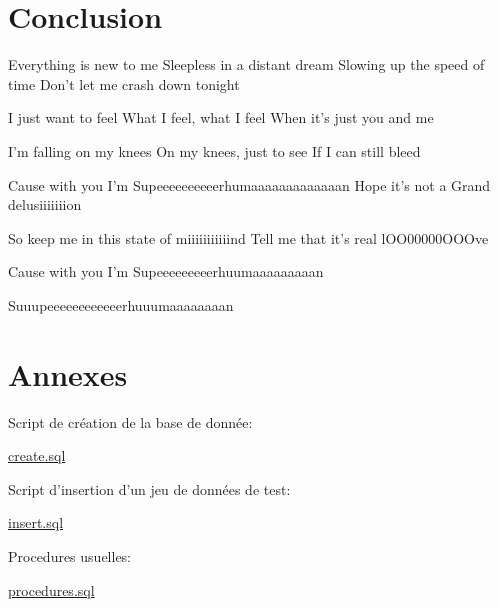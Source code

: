 \documentclass[]{article}
\begin{document}
\section{Conclusion}\label{conclusion}

Everything is new to me Sleepless in a distant dream Slowing up the
speed of time Don't let me crash down tonight

I just want to feel What I feel, what I feel When it's just you and me

I'm falling on my knees On my knees, just to see If I can still bleed

Cause with you I'm Supeeeeeeeeeerhumaaaaaaaaaaaaan Hope it's not a Grand
delusiiiiiiion

So keep me in this state of miiiiiiiiiiind Tell me that it's real
lOO00000OOOve

Cause with you I'm Supeeeeeeeeerhuumaaaaaaaaan

Suuupeeeeeeeeeeeerhuuumaaaaaaaan

\section{Annexes}\label{annexes}

Script de création de la base de donnée:

\href{../../script/create.sql}{create.sql}

Script d'insertion d'un jeu de données de test:

\href{../../script/insert.sql}{insert.sql}

Procedures usuelles:

\href{../../script/procedures.sql}{procedures.sql}
\end{document}
